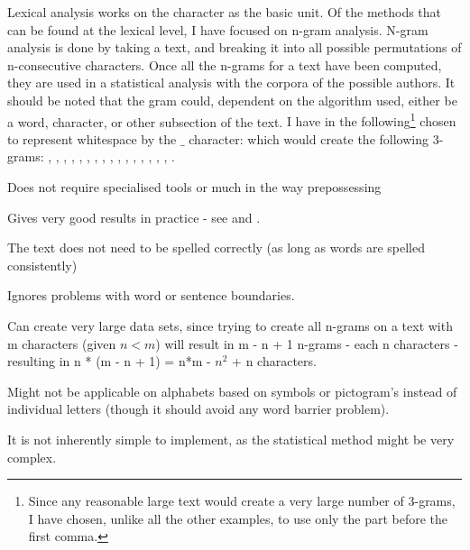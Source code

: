{\label{character}
Lexical analysis works on the character as the basic unit. Of the methods that can be found at the lexical level, I have focused on n-gram analysis. N-gram analysis is done by taking a text, and breaking it into all possible permutations of n-consecutive characters. Once all the n-grams for a text have been computed, they are used in a statistical analysis with the corpora of the possible authors. 
It should be noted that the gram could, dependent on the algorithm used, either be a word, character, or other subsection of the text.
}
{
I have in the following\footnote{Since any reasonable large text would create a very large number of 3-grams, I have chosen, unlike all the other examples, to use only the part before the first comma.} chosen to represent whitespace by the $\_$ character:
which would create the following 3-grams: , , , , , , , , , , , , , , , , . 
}
{
\item Does not require specialised tools or much in the way prepossessing
\item Gives very good results in practice - see \cite{nr4} and \cite{nr3}.
\item The text does not need to be spelled correctly (as long as words are spelled consistently)
\item Ignores problems with word or sentence boundaries.
}
{
\item Can create very large data sets, since trying to create all n-grams on a text with m characters (given $n < m$) will result in m - n + 1 n-grams - each n characters - resulting in n * (m - n + 1) = n*m - $n^2$ + n characters.
\item Might not be applicable on alphabets based on symbols or pictogram's instead of individual letters (though it should avoid any word barrier problem).
\item It is not inherently simple to implement, as the statistical method might be very complex.
}

